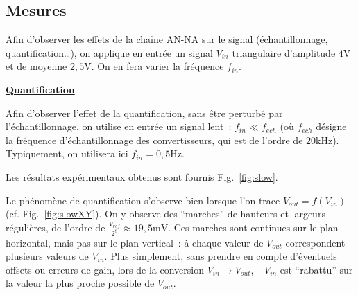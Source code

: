 \documentclass{article}
\begin{document}
\subsection{Mesures}


Afin d'observer les effets de la chaîne AN-NA sur le signal (échantillonnage, quantification\dots), on applique en entrée un signal $V_{in}$ triangulaire d'amplitude $4\mathrm{V}$ et de moyenne $2,5\mathrm{V}$. On en fera varier la fréquence $f_{in}$.

\noindent \textbf{\underline{Quantification}}.

Afin d'observer l'effet de la quantification, sans être perturbé par l'échantillonnage, on utilise en entrée un signal lent~: $f_{in}\ll f_{ech}$ (où $f_{ech}$ désigne la fréquence d'échantillonnage des convertisseurs, qui est de l'ordre de $20\mathrm{kHz}$). Typiquement, on utilisera ici $f_{in} = \mathrm{0,5 Hz}$.

Les résultats expérimentaux obtenus sont fournis Fig.~\ref{fig:slow}.


Le phénomène de quantification s'observe bien lorsque l'on trace $V_{out}=f(V_{in})$ (cf. Fig.~\ref{fig:slowXY}). On y observe des ``marches'' de hauteurs et largeurs régulières, de l'ordre de $\frac{V_{ref}}{2^8}\approx\mathrm{19,5 mV}$. Ces marches sont continues sur le plan horizontal, mais pas sur le plan vertical~: à chaque valeur de $V_{out}$ correspondent plusieurs valeurs de $V_{in}$. Plus simplement, sans prendre en compte d'éventuels offsets ou erreurs de gain, lors de la conversion $V_{in}\rightarrow V_{out}$, $-V_{in}$ est ``rabattu'' sur la valeur la plus proche possible de $V_{out}$.
\end{document}
